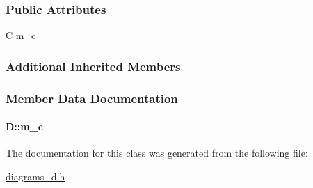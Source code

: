 \subsubsection*{Public Attributes}
\begin{DoxyCompactItemize}
\item 
\hyperlink{class_c}{C} \hyperlink{class_d_a9d877c7aa092f423f2a073f3c62fef9c}{m\+\_\+c}
\end{DoxyCompactItemize}
\subsubsection*{Additional Inherited Members}


\subsubsection{Member Data Documentation}
\paragraph[{\texorpdfstring{m\+\_\+c}{m_c}}]{ D\+::m\+\_\+c}\hypertarget{class_d_a9d877c7aa092f423f2a073f3c62fef9c}{}\label{class_d_a9d877c7aa092f423f2a073f3c62fef9c}


The documentation for this class was generated from the following file\+:\begin{DoxyCompactItemize}
\item 
\hyperlink{diagrams__d_8h}{diagrams\+\_\+d.\+h}\end{DoxyCompactItemize}
